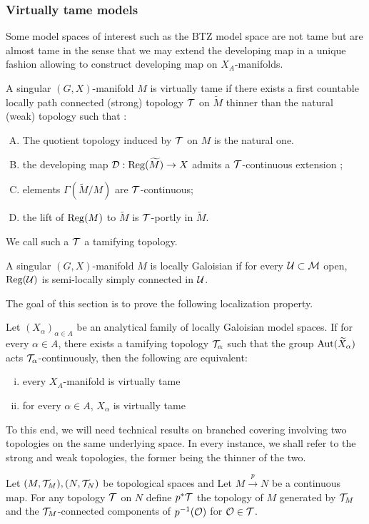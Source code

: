 \subsubsection{Virtually tame models}
Some model spaces of interest such as the BTZ model space are not tame  but are almost tame in the sense that we may extend the developing map in a unique fashion allowing to construct developing map on $X_A$-manifolds. 
\begin{defi} A singular $(G,X)$-manifold $M$ is virtually tame if there exists  a first countable locally path connected (strong) topology $\mathcal{T}$ on $\widetilde M$ thinner than the natural (weak) topology such that :
\begin{enumerate}[(A)]
\item The quotient topology induced by $\mathcal{T}$ on $M$ is the natural one.
 \item the developing map $\mathcal{D}:\mathrm{Reg}(\widetilde M)\rightarrow X$ admits a $\mathcal{T}$-continuous extension ;
 \item elements $\Gamma(\widetilde M/M)$ are $\mathcal{T}$-continuous;
 \item  the lift of $\mathrm{Reg}(M)$ to $\widetilde M$ is $\mathcal{T}$-portly in $\widetilde M$.
\end{enumerate}
We call such a $\mathcal{T}$ a tamifying topology.
\end{defi}
\begin{defi}A singular $(G,X)$-manifold $M$ is locally Galoisian  
if for every $\mathcal{U}\subset \mathcal M$ open, $\mathrm{Reg}(\mathcal{U})$ is semi-locally simply connected in $\mathcal{U}$.
\end{defi}
The goal of this section is to prove the following localization property.

\begin{thm}\label{theo:local_virt_tame} Let $(X_\alpha)_{\alpha\in A}$ be an analytical family of locally Galoisian model spaces.
If for every $\alpha\in A$, there exists a tamifying topology $\mathcal{T}_\alpha$ such that the group $\mathrm{Aut}(\widetilde X_\alpha)$ acts $\mathcal{T}_\alpha$-continuously,
 then the following are equivalent:
\begin{enumerate}[(i)]
 \item every $X_A$-manifold is virtually tame
 \item for every $\alpha \in A$, $X_\alpha$ is virtually tame
\end{enumerate}
\end{thm}

To this end, we will need technical results on branched covering involving two topologies on the same underlying space. In every instance, we shall refer to the strong and weak topologies, the former being the thinner of the two.
\begin{defi} Let $(M,\mathcal{T}_M),(N,\mathcal{T}_N)$ be topological spaces and Let $M\xrightarrow{p} N$ be a continuous map. For any topology $\mathcal{T}$ on $N$ define $p^*\mathcal{T}$ the topology of $M$ generated by $\mathcal{T}_M$ and the $\mathcal{T}_M$-connected components of $p^{-1}(\mathcal{O})$ for $\mathcal{O}\in \mathcal{T}$. 
 
\end{defi}



